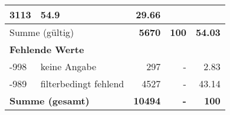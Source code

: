 \begin{longtable}{lXrrr}
       \num{3113} &
       \num[round-mode=places,round-precision=2]{54,9} &
         \num[round-mode=places,round-precision=2]{29,66} \\
     \midrule
     \multicolumn{2}{l}{Summe (gültig)} &
       \textbf{\num{5670}} &
     \textbf{100} &
       \textbf{\num[round-mode=places,round-precision=2]{54,03}} \\
     \multicolumn{5}{l}{\textbf{Fehlende Werte}}\\
       -998 &
       keine Angabe &
         \num{297} &
        - &
         \num[round-mode=places,round-precision=2]{2,83} \\
       -989 &
       filterbedingt fehlend &
         \num{4527} &
        - &
         \num[round-mode=places,round-precision=2]{43,14} \\
     \midrule
     \multicolumn{2}{l}{\textbf{Summe (gesamt)}} &
          \textbf{\num{10494}} &
        \textbf{-} &
        \textbf{100} \\
     \bottomrule
     \end{longtable}
     
